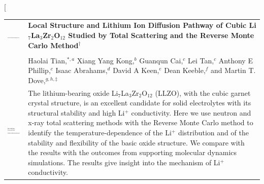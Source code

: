 \documentclass[twoside,twocolumn,9pt]{article}
\begin{document}
\twocolumn[
  \begin{@twocolumnfalse}
\vspace{3cm}
\sffamily
\begin{tabular}{m{4.5cm} p{13.5cm} }

\includegraphics{head_foot/DOI} & \noindent\LARGE{\textbf{Local Structure and Lithium Ion Diffusion Pathway of Cubic Li$_7$La$_3$Zr$_2$O$_{12}$ Studied by Total Scattering and the Reverse Monte Carlo Method$^\dag$}} \\%
\vspace{0.3cm} & \vspace{0.3cm} \\

 & \noindent\large{Haolai Tian,$^{\ast,a}$}
 Xiang Yang Kong,$^{b}$
 Guanqun Cai,$^{c}$
 Lei Tan,$^{c}$
 Anthony E Phillip,$^{c}$
 Isaac Abrahams,$^{d}$
 David A Keen,$^{e}$
 Dean Keeble,$^{f}$
and Martin T. Dove,\textit{$^{g,h,\ddag}$}
\\%

\includegraphics{head_foot/dates} & \noindent\normalsize{
The lithium-bearing oxide Li$_7$La$_3$Zr$_2$O$_{12}$ (LLZO), with the cubic garnet crystal structure, is an excellent candidate for solid electrolytes with its structural stability and high Li$^+$ conductivity. Here we use neutron and x-ray total scattering methods with the Reverse Monte Carlo method to identify the temperature-dependence of the Li$^+$ distribution and of the stability and flexibility of the basic oxide structure. We compare with the results with the outcomes from supporting molecular dynamics simulations. The results give insight into the mechanism  of Li$^+$ conductivity.
} \\

\end{tabular}

 \end{@twocolumnfalse} \vspace{0.6cm}
\end{document}
